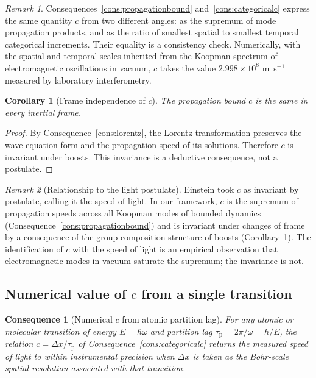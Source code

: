 \documentclass[11pt,twocolumn,a4paper]{article}
\theoremstyle{axiomstyle}
\theoremstyle{conseqstyle}
\newtheorem{consequence}{Consequence}
\newtheorem{corollary}{Corollary}
\theoremstyle{definition}
\theoremstyle{remark}
\newtheorem*{remark}{Remark}
\newcommand{\taup}{\tau_{\mathrm{p}}}
\begin{document}
\begin{remark}
Consequences~\ref{cons:propagationbound} and~\ref{cons:categoricalc} express the same quantity $c$ from two different angles: as the supremum of mode propagation products, and as the ratio of smallest spatial to smallest temporal categorical increments. Their equality is a consistency check. Numerically, with the spatial and temporal scales inherited from the Koopman spectrum of electromagnetic oscillations in vacuum, $c$ takes the value $2.998\times 10^{8}$ m~s$^{-1}$ measured by laboratory interferometry.
\end{remark}

\begin{corollary}[Frame independence of $c$]
\label{cor:cframe}
The propagation bound $c$ is the same in every inertial frame.
\end{corollary}

\begin{proof}
By Consequence~\ref{cons:lorentz}, the Lorentz transformation preserves the wave-equation form and the propagation speed of its solutions. Therefore $c$ is invariant under boosts. This invariance is a deductive consequence, not a postulate.
\end{proof}

\begin{remark}[Relationship to the light postulate]
Einstein \citep{einstein1905relativity} took $c$ as invariant by postulate, calling it the speed of light. In our framework, $c$ is the supremum of propagation speeds across all Koopman modes of bounded dynamics (Consequence~\ref{cons:propagationbound}) and is invariant under changes of frame by a consequence of the group composition structure of boosts (Corollary~\ref{cor:cframe}). The identification of $c$ with the speed of light is an empirical observation that electromagnetic modes in vacuum saturate the supremum; the invariance is not.
\end{remark}

\subsection{Numerical value of $c$ from a single transition}
\label{sec:cnumerical}

\begin{consequence}[Numerical $c$ from atomic partition lag]\label{cons:cnumerical}
For any atomic or molecular transition of energy $E=\hbar\omega$ and partition lag $\taup=2\pi/\omega=h/E$, the relation $c=\Delta x/\taup$ of Consequence~\ref{cons:categoricalc} returns the measured speed of light to within instrumental precision when $\Delta x$ is taken as the Bohr-scale spatial resolution associated with that transition.
\end{consequence}
\end{document}
